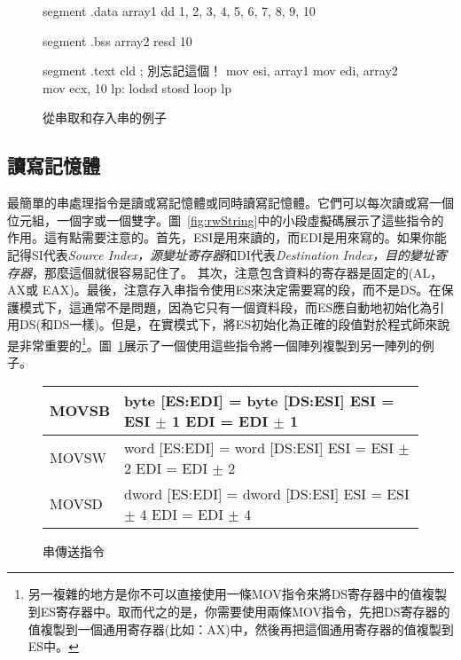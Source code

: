 \begin{figure}[t]
\begin{AsmCodeListing}[frame=single]
segment .data
array1  dd  1, 2, 3, 4, 5, 6, 7, 8, 9, 10

segment .bss
array2  resd 10

segment .text
      cld                   ; 別忘記這個！
      mov    esi, array1
      mov    edi, array2
      mov    ecx, 10
lp:
      lodsd
      stosd
      loop  lp
\end{AsmCodeListing}
\caption{從串取和存入串的例子\label{fig:lodEx}}
\end{figure}

\subsection{讀寫記憶體}

最簡單的串處理指令是讀或寫記憶體或同時讀寫記憶體。它們可以每次讀或寫一個位元組，一個字或一個雙字。圖~\ref{fig:rwString}中的小段虛擬碼展示了這些指令的作用。這有點需要注意的。首先，ESI是用來讀的，而EDI是用來寫的。如果你能記得SI代表\emph{Source Index，源變址寄存器}和DI代表\emph{Destination Index，目的變址寄存器}，那麼這個就很容易記住了。 其次，注意包含資料的寄存器是固定的(AL，AX或
EAX)。最後，注意存入串指令使用ES來決定需要寫的段，而不是DS。在保護模式下，這通常不是問題，因為它只有一個資料段，而ES應自動地初始化為引用DS(和DS一樣)。但是，在實模式下，將ES初始化為正確的段值對於程式師來說是非常重要的\footnote{另一複雜的地方是你不可以直接使用一條{\code MOV}指令來將DS寄存器中的值複製到ES寄存器中。取而代之的是，你需要使用兩條{\code MOV}指令，先把DS寄存器的值複製到一個通用寄存器(比如：AX)中，然後再把這個通用寄存器的值複製到ES中。}。圖~\ref{fig:lodEx}展示了一個使用這些指令將一個陣列複製到另一陣列的例子。

\begin{figure}[t]
\centering
{\code
\begin{tabular}{|lp{2.5in}|}
\hline
MOVSB & byte [ES:EDI] = byte [DS:ESI] \newline ESI = ESI $\pm$ 1 \newline
        EDI = EDI $\pm$ 1 \\
\hline
MOVSW & word [ES:EDI] = word [DS:ESI] \newline ESI = ESI $\pm$ 2 \newline
        EDI = EDI $\pm$ 2 \\
\hline
MOVSD & dword [ES:EDI] = dword [DS:ESI] \newline ESI = ESI $\pm$ 4 \newline
        EDI = EDI $\pm$ 4 \\
\hline
\end{tabular}
}
\caption{串傳送指令\label{fig:movString} 
          }
\end{figure}

